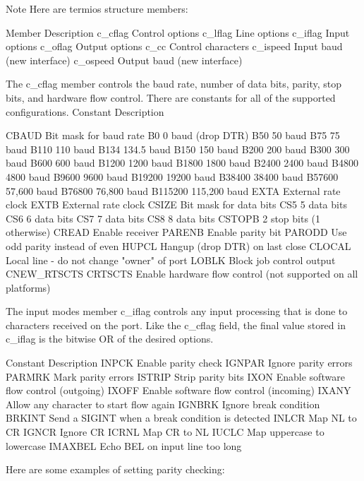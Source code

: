\begin{DoxyNote}{Note}
Here are termios structure members\+: \begin{DoxyVerb}Member      Description 
c_cflag     Control options 
c_lflag     Line options 
c_iflag     Input options 
c_oflag     Output options 
c_cc        Control characters 
c_ispeed    Input baud (new interface) 
c_ospeed    Output baud (new interface) 
\end{DoxyVerb}
 The c\+\_\+cflag member controls the baud rate, number of data bits, parity, stop bits, and hardware flow control. There are constants for all of the supported configurations. Constant Description \begin{DoxyVerb}CBAUD   Bit mask for baud rate 
B0  0 baud (drop DTR) 
B50 50 baud 
B75 75 baud 
B110    110 baud 
B134    134.5 baud 
B150    150 baud 
B200    200 baud 
B300    300 baud 
B600    600 baud 
B1200   1200 baud 
B1800   1800 baud 
B2400   2400 baud 
B4800   4800 baud 
B9600   9600 baud 
B19200  19200 baud 
B38400  38400 baud 
B57600  57,600 baud 
B76800  76,800 baud 
B115200 115,200 baud 
EXTA    External rate clock 
EXTB    External rate clock 
CSIZE   Bit mask for data bits 
CS5 5   data bits 
CS6 6   data bits 
CS7 7   data bits 
CS8 8   data bits 
CSTOPB  2 stop bits (1 otherwise) 
CREAD   Enable receiver 
PARENB  Enable parity bit 
PARODD  Use odd parity instead of even 
HUPCL   Hangup (drop DTR) on last close 
CLOCAL  Local line - do not change "owner" of port 
LOBLK   Block job control output 
CNEW_RTSCTS CRTSCTS Enable hardware flow control (not supported on all 
platforms) 
\end{DoxyVerb}
 The input modes member c\+\_\+iflag controls any input processing that is done to characters received on the port. Like the c\+\_\+cflag field, the final value stored in c\+\_\+iflag is the bitwise OR of the desired options. \begin{DoxyVerb}Constant    Description 
INPCK   Enable parity check 
IGNPAR  Ignore parity errors 
PARMRK  Mark parity errors 
ISTRIP  Strip parity bits 
IXON    Enable software flow control (outgoing) 
IXOFF   Enable software flow control (incoming) 
IXANY   Allow any character to start flow again 
IGNBRK  Ignore break condition 
BRKINT  Send a SIGINT when a break condition is detected 
INLCR   Map NL to CR 
IGNCR   Ignore CR 
ICRNL   Map CR to NL 
IUCLC   Map uppercase to lowercase 
IMAXBEL Echo BEL on input line too long 
\end{DoxyVerb}
 Here are some examples of setting parity checking\+: ~\newline

\end{DoxyNote}

